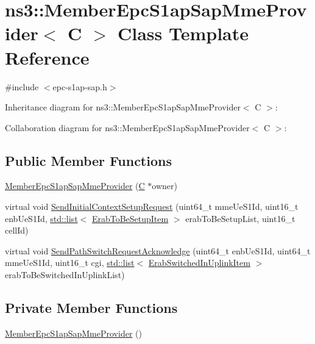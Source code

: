 \hypertarget{classns3_1_1MemberEpcS1apSapMmeProvider}{}\section{ns3\+:\+:Member\+Epc\+S1ap\+Sap\+Mme\+Provider$<$ C $>$ Class Template Reference}
\label{classns3_1_1MemberEpcS1apSapMmeProvider}


{\ttfamily \#include $<$epc-\/s1ap-\/sap.\+h$>$}



Inheritance diagram for ns3\+:\+:Member\+Epc\+S1ap\+Sap\+Mme\+Provider$<$ C $>$\+:


Collaboration diagram for ns3\+:\+:Member\+Epc\+S1ap\+Sap\+Mme\+Provider$<$ C $>$\+:
\subsection*{Public Member Functions}
\begin{DoxyCompactItemize}
\item 
\hyperlink{classns3_1_1MemberEpcS1apSapMmeProvider_a231fb4ae785b9c2138a734a8b6990a55}{Member\+Epc\+S1ap\+Sap\+Mme\+Provider} (\hyperlink{loss__COST231__small__cities__urban_8m_aaa53ca0b650dfd85c4f59fa156f7a2cc}{C} $\ast$owner)
\item 
virtual void \hyperlink{classns3_1_1MemberEpcS1apSapMmeProvider_aab61bde8e967dda3b3a94bd12a8d5657}{Send\+Initial\+Context\+Setup\+Request} (uint64\+\_\+t mme\+Ue\+S1\+Id, uint16\+\_\+t enb\+Ue\+S1\+Id, \hyperlink{openflow-interface_8h_afd9bcfa176617760671b67580f536fa7}{std\+::list}$<$ \hyperlink{structns3_1_1EpcS1apSap_1_1ErabToBeSetupItem}{Erab\+To\+Be\+Setup\+Item} $>$ erab\+To\+Be\+Setup\+List, uint16\+\_\+t cell\+Id)
\item 
virtual void \hyperlink{classns3_1_1MemberEpcS1apSapMmeProvider_ae78aba351d783d8e467ac9b31d4e8eab}{Send\+Path\+Switch\+Request\+Acknowledge} (uint64\+\_\+t enb\+Ue\+S1\+Id, uint64\+\_\+t mme\+Ue\+S1\+Id, uint16\+\_\+t cgi, \hyperlink{openflow-interface_8h_afd9bcfa176617760671b67580f536fa7}{std\+::list}$<$ \hyperlink{structns3_1_1EpcS1apSap_1_1ErabSwitchedInUplinkItem}{Erab\+Switched\+In\+Uplink\+Item} $>$ erab\+To\+Be\+Switched\+In\+Uplink\+List)
\end{DoxyCompactItemize}
\subsection*{Private Member Functions}
\begin{DoxyCompactItemize}
\item 
\hyperlink{classns3_1_1MemberEpcS1apSapMmeProvider_aa746020880e111d5ed8c0a627fa8f3ed}{Member\+Epc\+S1ap\+Sap\+Mme\+Provider} ()
\end{DoxyCompactItemize}
